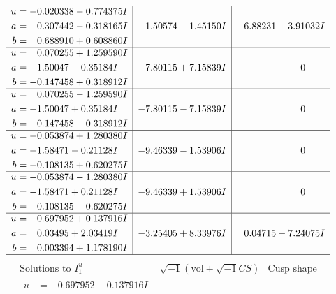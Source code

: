 \documentclass[1p]{elsarticle_modified}
\theoremstyle{definition}
\newcommand{\I}{\sqrt{-1}}
\begin{document}
$$\begin{array}{c|c|c}
\begin{aligned}
u &= -0.020338 - 0.774375 I \\
a &= \phantom{-}0.307442 - 0.318165 I \\
b &= \phantom{-}0.688910 + 0.608860 I\end{aligned}
 & -1.50574 - 1.45150 I & -6.88231 + 3.91032 I \\ \hline\begin{aligned}
u &= \phantom{-}0.070255 + 1.259590 I \\
a &= -1.50047 - 0.35184 I \\
b &= -0.147458 + 0.318912 I\end{aligned}
 & -7.80115 + 7.15839 I & \phantom{-0.000000 } 0 \\ \hline\begin{aligned}
u &= \phantom{-}0.070255 - 1.259590 I \\
a &= -1.50047 + 0.35184 I \\
b &= -0.147458 - 0.318912 I\end{aligned}
 & -7.80115 - 7.15839 I & \phantom{-0.000000 } 0 \\ \hline\begin{aligned}
u &= -0.053874 + 1.280380 I \\
a &= -1.58471 - 0.21128 I \\
b &= -0.108135 + 0.620275 I\end{aligned}
 & -9.46339 - 1.53906 I & \phantom{-0.000000 } 0 \\ \hline\begin{aligned}
u &= -0.053874 - 1.280380 I \\
a &= -1.58471 + 0.21128 I \\
b &= -0.108135 - 0.620275 I\end{aligned}
 & -9.46339 + 1.53906 I & \phantom{-0.000000 } 0 \\ \hline\begin{aligned}
u &= -0.697952 + 0.137916 I \\
a &= \phantom{-}0.03495 + 2.03419 I \\
b &= \phantom{-}0.003394 + 1.178190 I\end{aligned}
 & -3.25405 + 8.33976 I & \phantom{-}0.04715 - 7.24075 I\\
 \hline 
 \end{array}$$\newpage$$\begin{array}{c|c|c}  
\text{Solutions to }I^u_{1}& \I (\text{vol} + \sqrt{-1}CS) & \text{Cusp shape}\\
 \hline 
\begin{aligned}
u &= -0.697952 - 0.137916 I \\

\end{aligned}
\end{array}$$
\end{document}
